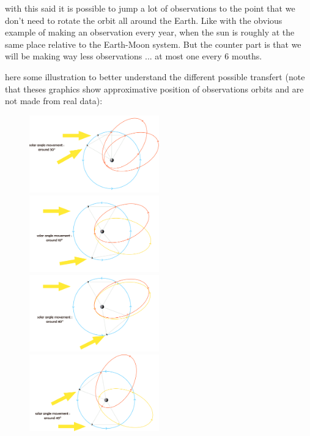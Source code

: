 \documentclass{article} %
\begin{document}
			
			
			 with this said it is possible to jump a lot of observations to the point that we don't need to rotate the orbit all around the Earth. Like with the obvious example of making an observation every year, when the sun is roughly at the same place relative to the Earth-Moon system. But the counter part is that we will be making way less observations ... at most one every 6 mouths. 
			
			here some illustration to better understand the different possible transfert (note that theses graphics show approximative position of observations orbits and are not made from real data):
			
			\begin{figure}[h]
				\includegraphics[width=0.5\textwidth]{images/1in2obs.png}
				\includegraphics[width=0.5\textwidth]{images/odd_to_even.png}
				\includegraphics[width=0.5\textwidth]{images/1in3_obs.png}
				\includegraphics[width=0.5\textwidth]{images/1in3_bad.png}
			\end{figure}
			
\end{document}
